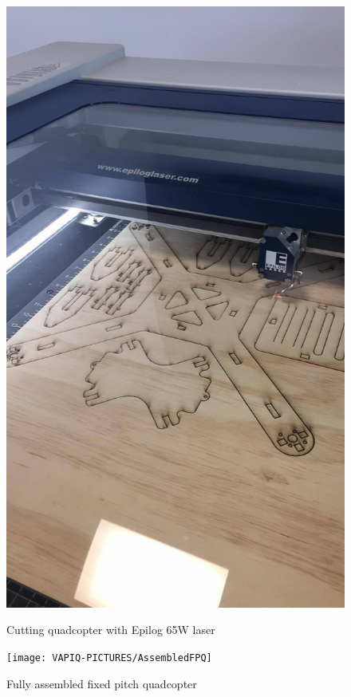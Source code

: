 \begin{figure}[h]
        \centering
         \begin{minipage}[b]{0.3\textwidth}
            \includegraphics[width = 1\textwidth]{VAPIQ-PICTURES/LaserCut}
              \caption{Cutting quadcopter with Epilog 65W laser}
            \label{fig:CarbonFPQ}
        \end{minipage}
        \hfill
        \begin{minipage}[b]{0.65\textwidth}
            \texttt{[image: VAPIQ-PICTURES/AssembledFPQ]}
            \caption{Fully assembled fixed pitch quadcopter}
            \label{fig:Assey}
        \end{minipage}
\end{figure}



